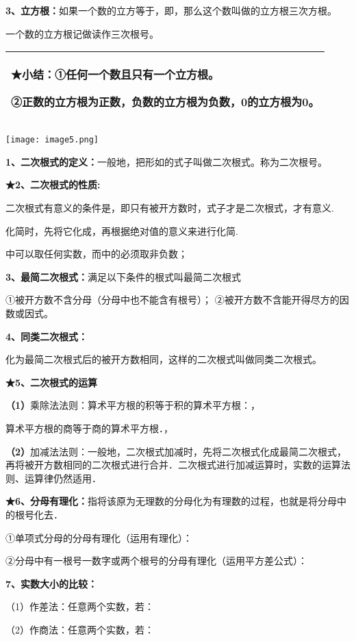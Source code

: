 \textbf{3、立方根：}如果一个数的立方等于，即，那么这个数叫做的立方根三次方根。

一个数的立方根记做读作三次根号。

\begin{longtable}[]{@{}l@{}}
\toprule
\endhead
\begin{minipage}[t]{0.97\columnwidth}\raggedright
★小结：①任何一个数且只有一个立方根。

②正数的立方根为正数，负数的立方根为负数，0的立方根为0。\strut
\end{minipage}\tabularnewline
\bottomrule
\end{longtable}

\texttt{[image: image5.png]}

\textbf{1、二次根式的定义：}一般地，把形如的式子叫做二次根式。称为二次根号。

\textbf{★2、二次根式的性质:}

二次根式有意义的条件是，即只有被开方数时，式子才是二次根式，才有意义.

化简时，先将它化成，再根据绝对值的意义来进行化简.

中可以取任何实数，而中的必须取非负数；

\textbf{3、最简二次根式：}满足以下条件的根式叫最简二次根式

①被开方数不含分母（分母中也不能含有根号）；
②被开方数不含能开得尽方的因数或因式。

\textbf{4、同类二次根式：}

化为最简二次根式后的被开方数相同，这样的二次根式叫做同类二次根式。

\textbf{★5、二次根式的运算}

\textbf{（1）}乘除法法则：算术平方根的积等于积的算术平方根：，

算术平方根的商等于商的算术平方根．，

\textbf{（2）}加减法法则：一般地，二次根式加减时，先将二次根式化成最简二次根式，再将被开方数相同的二次根式进行合并．二次根式进行加减运算时，实数的运算法则、运算律仍然适用．

\textbf{★6、分母有理化：}指将该原为无理数的分母化为有理数的过程，也就是将分母中的根号化去．

①单项式分母的分母有理化（运用有理化）：

②分母中有一根号一数字或两个根号的分母有理化（运用平方差公式）：

\textbf{7、实数大小的比较：}

（1）作差法：任意两个实数，若：

（2）作商法：任意两个实数，若：

